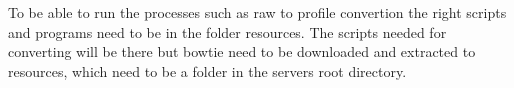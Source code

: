 To be able to run the processes such as raw to profile convertion the right scripts and programs need to be in the folder resources. The scripts needed for converting will be there but bowtie need to be downloaded and extracted to resources, which need to be a folder in the servers root directory.
